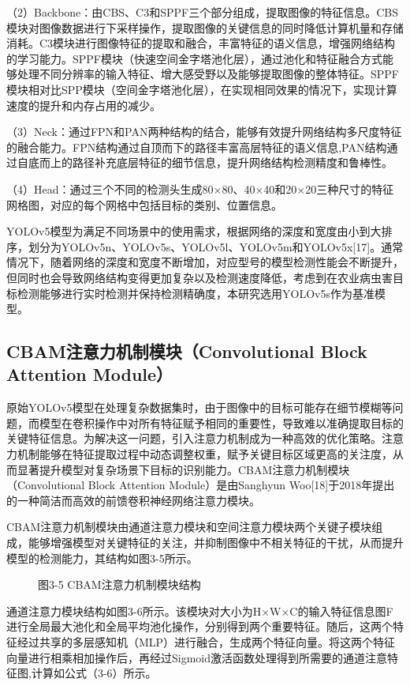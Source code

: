 \documentclass[12pt, a4paper, twoside]{ctexart}
\begin{document}
（2）Backbone：由CBS、C3和SPPF三个部分组成，提取图像的特征信息。CBS模块对图像数据进行下采样操作，提取图像的关键信息的同时降低计算机量和存储消耗。C3模块进行图像特征的提取和融合，丰富特征的语义信息，增强网络结构的学习能力。SPPF模块（快速空间金字塔池化层），通过池化和特征融合方式能够处理不同分辨率的输入特征、增大感受野以及能够提取图像的整体特征。SPPF模块相对比SPP模块（空间金字塔池化层），在实现相同效果的情况下，实现计算速度的提升和内存占用的减少。

（3）Neck：通过FPN和PAN两种结构的结合，能够有效提升网络结构多尺度特征的融合能力。FPN结构通过自顶而下的路径丰富高层特征的语义信息,PAN结构通过自底而上的路径补充底层特征的细节信息，提升网络结构检测精度和鲁棒性。

（4）Head：通过三个不同的检测头生成80×80、40×40和20×20三种尺寸的特征网格图，对应的每个网格中包括目标的类别、位置信息。

YOLOv5模型为满足不同场景中的使用需求，根据网络的深度和宽度由小到大排序，划分为YOLOv5n、YOLOv5s、YOLOv5l、YOLOv5m和YOLOv5x[17]。通常情况下，随着网络的深度和宽度不断增加，对应型号的模型检测性能会不断提升，但同时也会导致网络结构变得更加复杂以及检测速度降低，考虑到在农业病虫害目标检测能够进行实时检测并保持检测精确度，本研究选用YOLOv5s作为基准模型。


\subsection{CBAM注意力机制模块（Convolutional Block Attention Module）}

原始YOLOv5模型在处理复杂数据集时，由于图像中的目标可能存在细节模糊等问题，而模型在卷积操作中对所有特征赋予相同的重要性，导致难以准确提取目标的关键特征信息。为解决这一问题，引入注意力机制成为一种高效的优化策略。注意力机制能够在特征提取过程中动态调整权重，赋予关键目标区域更高的关注度，从而显著提升模型对复杂场景下目标的识别能力。CBAM注意力机制模块（Convolutional Block Attention Module）是由Sanghyun Woo[18]于2018年提出的一种简洁而高效的前馈卷积神经网络注意力模块。

CBAM注意力机制模块由通道注意力模块和空间注意力模块两个关键子模块组成，能够增强模型对关键特征的关注，并抑制图像中不相关特征的干扰，从而提升模型的检测能力，其结构如图3-5所示。


\begin{figure}[htbp]
\centering
\caption{图3-5 CBAM注意力机制模块结构}
\end{figure}

通道注意力模块结构如图3-6所示。该模块对大小为H×W×C的输入特征信息图F进行全局最大池化和全局平均池化操作，分别得到两个重要特征。随后，这两个特征经过共享的多层感知机（MLP）进行融合，生成两个特征向量。将这两个特征向量进行相乘相加操作后，再经过Sigmoid激活函数处理得到所需要的通道注意特征图,计算如公式（3-6）所示。
\end{document}

